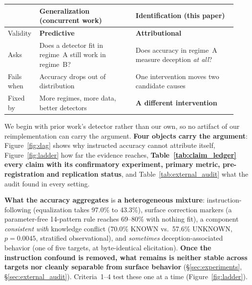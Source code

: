 \begin{center}\small
\setlength{\tabcolsep}{3pt}
\begin{tabular}{@{}p{0.11\linewidth}p{0.40\linewidth}p{0.42\linewidth}@{}}
\toprule
 & \textbf{Generalization} (concurrent work) & \textbf{Identification} (this paper) \\
\midrule
Validity & \textbf{Predictive} & \textbf{Attributional} \\
Asks & Does a detector fit in regime~A still work in regime~B? & Does accuracy in regime~A measure deception \emph{at all}? \\
Fails when & Accuracy drops out of distribution & One intervention moves two candidate causes \\
Fixed by & More regimes, more data, better detectors & \textbf{A different intervention} \\
\bottomrule
\end{tabular}
\end{center}

We begin with prior work's detector rather than our own, so no artifact of our reimplementation can carry the argument. \textbf{Four objects carry the argument}: Figure~\ref{fig:dag} shows why instructed accuracy cannot attribute itself, Figure~\ref{fig:ladder} how far the evidence reaches, \textbf{Table~\ref{tab:claim_ledger} every claim with its confirmatory experiment, primary metric, pre-registration and replication status}, and Table~\ref{tab:external_audit} what the audit found in every setting.

\noindent{}

\noindent\textbf{What the accuracy aggregates} is \textbf{a heterogeneous mixture}: instruction-following (equalization takes 97.0\% to 43.3\%), surface correction markers (a parameter-free 14-pattern rule reaches 69--80\% with nothing fit), a component \emph{consistent with} knowledge conflict (70.0\% KNOWN vs.\ 57.6\% UNKNOWN, $p\!=\!0.0045$, stratified observational), and \emph{sometimes} deception-associated behavior (one of five targets, at byte-identical elicitation). \textbf{Once the instruction confound is removed, what remains is neither stable across targets nor cleanly separable from surface behavior} (§\ref{sec:experiments}, §\ref{sec:external_audit}). Criteria~1--4 test these one at a time (Figure~\ref{fig:ladder}).

